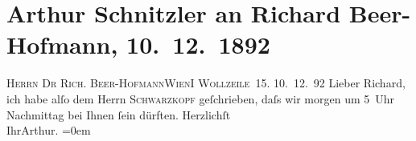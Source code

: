 

         
         \renewcommand{\erwaehntePersonen}{Personen: Richard Beer-Hofmann, Gustav Schwarzkopf}
         \renewcommand{\erwaehnteOrte}{Orte: Wien, Wollzeile}
         \renewcommand{\erwaehnteWerke}{}
               \section[Arthur Schnitzler an Richard Beer-Hofmann, 10. 12. 1892]{ Arthur Schnitzler an Richard Beer-Hofmann, 10. 12. 1892}\nopagebreak{}\rehead{ }\begin{ledgroupsized}[t]{13cm}\normalsize\beginnumbering \toendnotes[C]{\smallbreak\pagebreak[2]} 
\pstart{}{\pb}\textsc{Herrn Dr Rich. Beer-Hofmann}\pend{}\pstart{}\textsc{Wien}\pend{}\pstart{}\textsc{I Wollzeile 15}.\pend{}{\bigskip}\pstart
           \raggedleft{}{\pb}10. 12. 92\pend
           \pstart{}Lieber Richard, \pend\pstart
           ich habe alſo dem Herrn \textsc{Schwarzkopf} geſchrieben, daſs wir morgen um 5 Uhr
                  Nachmittag bei Ihnen ſein dürften.\pend
           \pstart
           Herzlichſt{\\[\baselineskip]}Ihr\spacefill\mbox{Arthur.}\pend
           \leftskip=0em{}
         
         \endnumbering{}\end{ledgroupsized}  \newcommand{\dateiname}{L00142}\newcommand{\titel}{Arthur Schnitzler an Richard Beer-Hofmann, 10. 12. 1892}\newcommand{\editorInnen}{Martin Anton Müller und Gerd-Hermann Susen}
      